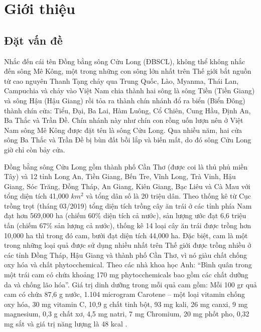 \chapter{Giới thiệu} \label{chapter01}

\section{Đặt vấn đề}\label{datvande}
Nhắc đến cái tên Đồng bằng sông Cửu Long (ĐBSCL), không thể không nhắc đến sông Mê Kông, một trong những con sông lớn nhất trên Thế giới bắt nguồn từ cao nguyên Thanh Tạng chảy qua Trung Quốc, Lào, Myanma, Thái Lan, Campuchia và chảy vào Việt Nam chia thành hai sông là sông Tiền (Tiền Giang) và sông Hậu (Hậu Giang) rồi tỏa ra thành chín nhánh đổ ra biển (Biển Đông) thành chín cửa: Tiểu, Đại, Ba Lai, Hàm Luông, Cổ Chiên, Cung Hầu, Định An, Ba Thắc và Trần Đề. Chín nhánh này như chín con rồng uốn lượn nên ở Việt Nam sông Mê Kông được đặt tên là sông Cửu Long. Qua nhiều năm, hai cửa sông Ba Thắc và Trần Đề bị bùn đất bồi lắp và biến mất, do đó sông Cửu Long giờ chỉ còn bảy cửa.\par

Đồng bằng sông Cửu Long gồm thành phố Cần Thơ (được coi là thủ phủ miền Tây) và 12 tỉnh Long An, Tiền Giang, Bến Tre, Vĩnh Long, Trà Vinh, Hậu Giang, Sóc Trăng, Đồng Tháp, An Giang, Kiên Giang, Bạc Liêu và Cà Mau với tổng diện tích 41,000 $km^2$ và tổng dân số là 20 triệu dân. Theo thống kê từ Cục trồng trọt (tháng 03/2019) tổng diện tích trồng cây ăn trái ở các tỉnh phía Nam đạt hơn 569,000 ha (chiếm 60\% diện tích cả nước), sản lượng ước đạt 6,6 triệu tấn (chiếm 67\% sản lượng cả nước), thống kê 14 loại cây ăn trái được trồng hơn 10,000 ha thì trong đó cam, bưởi đạt diện tích 44,000 ha. Đặc biệt, cam là một trong những loại quả được sử dụng nhiều nhất trên Thế giới được trồng nhiều  ở các tỉnh Đồng Tháp, Hậu Giang và thành phố Cần Thơ, vì nó giàu chất chống oxy hóa và chất phytocchemical. Theo các nhà khoa học Anh: ``Bình quân trong một trái cam có chứa khoảng 170 mg phytocchemicals bao gồm các chất dưỡng da và chống lão hóa''. Giá trị dinh dưỡng trong mỗi quả cam gồm: Mỗi 100 gr quả cam có chứa 87,6 g nước, 1.104 microgram Carotene -- một loại vitamin chống oxy hóa, 30 mg vitamin C, 10,9 g chất tinh bột, 93 mg kali, 26 mg canxi, 9 mg magnesium, 0,3 g chất xơ, 4,5 mg natri, 7 mg Chromium, 20 mg phốt pho, 0,32 mg sắt và giá trị năng lượng là 48 kcal \cite{bvdk-hongngoc}. 

